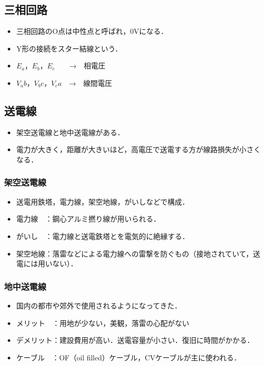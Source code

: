 \subsection{三相回路}


\begin{itemize}
  \item 三相回路のO点は中性点と呼ばれ，0Vになる．
  \item Y形の接続をスター結線という．
  \item $E_a$，$E_b$，$E_c$　　→　相電圧
  \item $V_ab$，$V_bc$，$V_ca$　→　線間電圧
\end{itemize}

\subsection{送電線}
\begin{itemize}
  \item 架空送電線と地中送電線がある．
  \item 電力が大きく，距離が大きいほど，高電圧で送電する方が線路損失が小さくなる．
\end{itemize}

\subsubsection{架空送電線}
\begin{itemize}
  \item 送電用鉄塔，電力線，架空地線，がいしなどで構成．
  \item 電力線　：鋼心アルミ撚り線が用いられる．
  \item がいし　：電力線と送電鉄塔とを電気的に絶縁する．
  \item 架空地線：落雷などによる電力線への雷撃を防ぐもの（接地されていて，送電には用いない）．
\end{itemize}



\subsubsection{地中送電線}
\begin{itemize}
  \item 国内の都市や郊外で使用されるようになってきた．
  \item メリット　：用地が少ない，美観，落雷の心配がない
  \item デメリット：建設費用が高い．送電容量が小さい．復旧に時間がかかる．
  \item ケーブル　：OF（oil filled）ケーブル，CVケーブルが主に使われる．
\end{itemize}

